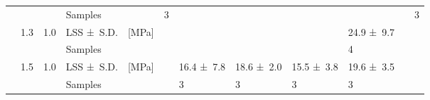 \begin{table}[htb]
{\begin{tabular}{@{}lll L{1.6cm} l C{1.1cm} C{1.1cm} C{1.1cm} C{1.1cm} C{1.1cm} C{1.1cm} C{1.1cm} @{}}
		                   &          &           & Samples           &       & 3                 &                   &                   &                   &                   &                   & 3                 \\
		                   & 1.3      & 1.0       & LSS \mbox{± S.D.} & [MPa] &                   &                   &                   &                   & 24.9 \mbox{± 9.7} &                   &                   \\
		                   &          &           & Samples           &       &                   &                   &                   &                   & 4                 &                   &                   \\
		                   & 1.5      & 1.0       & LSS \mbox{± S.D.} & [MPa] &                   & 16.4 \mbox{± 7.8} & 18.6 \mbox{± 2.0} & 15.5 \mbox{± 3.8} & 19.6 \mbox{± 3.5} &                   &                   \\
		                   &          &           & Samples           &       &                   & 3                 & 3                 & 3                 & 3                 &                   &                   \\ \bottomrule
		\end{tabular}}
	\label{tab:T2_table3}
\end{table}

